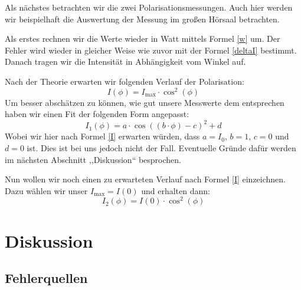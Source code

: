 \documentclass[titlepage,11pt,a4paper,ngerman]{article}
\newcommand{\tx}[1]{\textrm{#1}}
\begin{document}
Als nächstes betrachten wir die zwei Polarisationsmessungen. Auch hier werden wir beispielhaft die Auswertung der Messung im großen Hörsaal betrachten. \par 
Als erstes rechnen wir die Werte wieder in Watt mittels Formel \eqref{w} um. Der Fehler wird wieder in gleicher Weise wie zuvor mit der Formel \eqref{deltaI} bestimmt. Danach tragen wir die Intensität in Abhängigkeit vom Winkel auf. \par 
Nach der Theorie erwarten wir folgenden Verlauf der Polarisation:
\begin{equation}
I(\phi) = I_{\tx{max}}\cdot \cos^{2}(\phi)
\label{I}
\end{equation}
Um besser abschätzen zu können, wie gut unsere Messwerte dem entsprechen haben wir einen Fit der folgenden Form angepasst:
\begin{equation}
I_{1}(\phi) = a \cdot \cos((b \cdot\phi) - c)^{2} + d
\label{I1}
\end{equation}
Wobei wir hier nach Formel \eqref{I} erwarten würden, dass $a=I_{0}$, $b=1$, $c=0$ und $d=0$ ist. Dies ist bei uns jedoch nicht der Fall. Eventuelle Gründe dafür werden im nächsten Abschnitt ,,Diskussion`` besprochen. \par 
Nun wollen wir noch einen zu erwarteten Verlauf nach Formel \eqref{I} einzeichnen. Dazu wählen wir unser $I_{\tx{max}}=I(0)$ und erhalten dann:
\begin{equation}
I_{2}(\phi) = I(0)\cdot \cos^{2}(\phi)
\label{I2}
\end{equation}

\section{Diskussion}

\subsection{Fehlerquellen}
\end{document}
